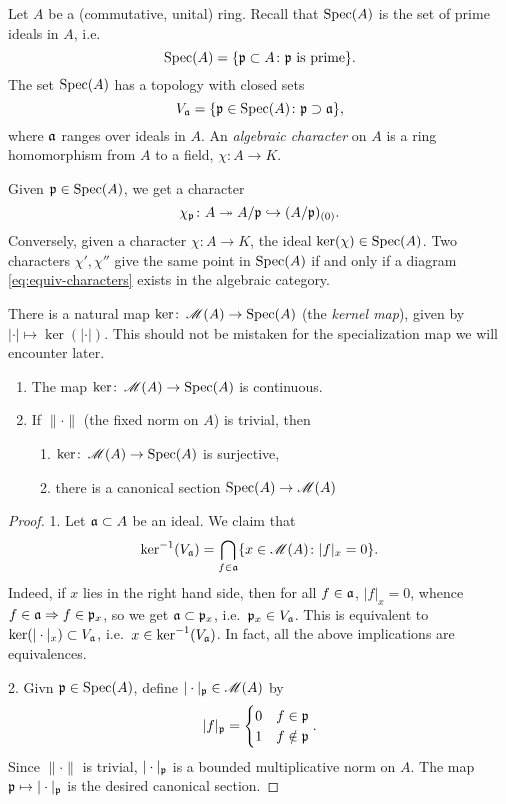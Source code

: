 Let $A$ be a (commutative, unital) ring. Recall that $\operatorname{Spec}(A)$ is the set of 
prime ideals in $A$, i.e.
\[
  \operatorname{Spec}(A) = \{\mathfrak{p}\subset A\colon \mathfrak{p}\text{ is prime}\} .
\]
The set $\operatorname{Spec}(A)$ has a topology with closed sets 
\[
  V_{\mathfrak{a}} = \{\mathfrak{p}\in \operatorname{Spec}(A)\colon \mathfrak{p}\supset \mathfrak{a}\} ,
\]
where $\mathfrak{a}$ ranges over ideals in $A$. An \emph{algebraic character} on $A$ is 
a ring homomorphism from $A$ to a field, $\chi\colon A\to K$. 

Given $\mathfrak{p}\in \operatorname{Spec}(A)$, we get a character 
\[
  \chi_{\mathfrak{p}}\colon A\twoheadrightarrow A/\mathfrak{p} \hookrightarrow (A/\mathfrak{p})_{(0)} .
\]
Conversely, given a character $\chi\colon A\to K$, the ideal 
$\ker(\chi)\in \operatorname{Spec}(A)$. Two characters $\chi',\chi''$ give the same point in 
$\operatorname{Spec}(A)$ if and only if a diagram \eqref{eq:equiv-characters} exists in the 
algebraic category.

There is a natural map $\ker\colon \operatorname{\mathscr{M}}(A)\to \operatorname{Spec}(A)$ (the \emph{kernel 
map}), given by $|\cdot|\mapsto \ker(|\cdot|)$. This should not be mistaken for 
the specialization map we will encounter later. 

\begin{lemma}
\leavevmode
\begin{enumerate}
\item
The map $\ker\colon \operatorname{\mathscr{M}}(A)\to \operatorname{Spec}(A)$ is continuous. 

\item
If $\|\cdot\|$ (the fixed norm on $A$) is trivial, then 
\begin{enumerate}
\item
$\ker\colon \operatorname{\mathscr{M}}(A)\to \operatorname{Spec}(A)$ is surjective, 

\item
there is a canonical section $\operatorname{Spec}(A)\to \operatorname{\mathscr{M}}(A)$
\end{enumerate}
\end{enumerate}
\end{lemma}
\begin{proof}
1. Let $\mathfrak{a}\subset A$ be an ideal. We claim that  
\[
  \ker^{-1}(V_{\mathfrak{a}}) = \bigcap_{f\in \mathfrak{a}}\{x\in \operatorname{\mathscr{M}}(A)\colon |f|_x = 0\} .
\]
Indeed, if $x$ lies in the right hand side, then for all $f\in \mathfrak{a}$, 
$|f|_x=0$, whence $f\in \mathfrak{a}\Rightarrow f\in \mathfrak{p}_x$, so we get 
$\mathfrak{a}\subset \mathfrak{p}_x$, i.e.~$\mathfrak{p}_x\in V_{\mathfrak{a}}$. This is equivalent to 
$\ker(|\cdot|_x)\subset V_{\mathfrak{a}}$, i.e.~$x\in \ker^{-1}(V_{\mathfrak{a}})$. In fact, all the 
above implications are equivalences.

2. Givn $\mathfrak{p}\in \operatorname{Spec}(A)$, define $|\cdot|_{\mathfrak{p}}\in \operatorname{\mathscr{M}}(A)$ by 
\[
  |f|_{\mathfrak{p}} = \begin{cases} 0 & f\in \mathfrak{p} \\ 1 & f\notin \mathfrak{p} \end{cases} .
\]
Since $\|\cdot\|$ is trivial, $|\cdot|_{\mathfrak{p}}$ is a bounded multiplicative 
norm on $A$. The map $\mathfrak{p}\mapsto |\cdot|_{\mathfrak{p}}$ is the desired canonical 
section. 
\end{proof}


